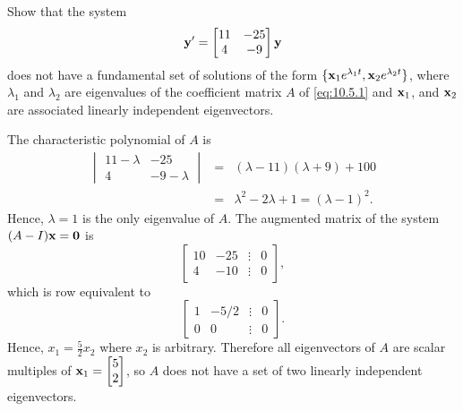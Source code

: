 \documentclass{ximera}
\begin{document}
\begin{example}\label{example:10.5.1}
Show that the system
\begin{equation}\label{eq:10.5.1}
{\bf y}'=\begin{bmatrix}11&-25\\4&-9\end{bmatrix}{\bf y}
\end{equation}
does not have a fundamental set of solutions of the form $\{{\bf
x}_1e^{\lambda_1t},{\bf x}_2e^{\lambda_2t}\}$, where $\lambda_1$ and
$\lambda_2$ are eigenvalues of the coefficient matrix $A$ of
\eqref{eq:10.5.1} and ${\bf x}_1$, and ${\bf x}_2$ are associated
linearly independent eigenvectors.

\begin{explanation}   
The characteristic polynomial of $A$ is
\begin{eqnarray*}
\begin{vmatrix}11-\lambda&-25\\4&-9-\lambda\end{vmatrix}
&=&(\lambda-11)(\lambda+9)+100\\
&=&\lambda^2-2\lambda+1=(\lambda-1)^2.
\end{eqnarray*}
Hence, $\lambda=1$ is the only eigenvalue of $A$. The augmented
matrix of the system $(A-I){\bf x}={\bf 0}$ is
$$
\begin{bmatrix}10&-25&\vdots&0\\4&
-10&\vdots&0\end{bmatrix},
$$
which is row equivalent to
$$
\begin{bmatrix}1&-5/2&\vdots&0\\0&
0&\vdots&0\end{bmatrix}.
$$
Hence, $x_1=\frac{5}{2}x_2$ where $x_2$ is arbitrary. Therefore all
eigenvectors of $A$ are scalar multiples of ${\bf
x}_1=\begin{bmatrix}5\\2\end{bmatrix}$,
so $A$ does not have a set of two linearly independent eigenvectors.
\end{explanation}
\end{example}
\end{document}
